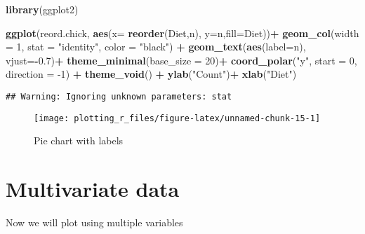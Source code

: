 \documentclass[
]{book}
\newenvironment{Shaded}{\begin{snugshade}}{\end{snugshade}}
\newcommand{\DataTypeTok}[1]{\textcolor[rgb]{0.13,0.29,0.53}{#1}}
\newcommand{\DecValTok}[1]{\textcolor[rgb]{0.00,0.00,0.81}{#1}}
\newcommand{\FloatTok}[1]{\textcolor[rgb]{0.00,0.00,0.81}{#1}}
\newcommand{\KeywordTok}[1]{\textcolor[rgb]{0.13,0.29,0.53}{\textbf{#1}}}
\newcommand{\NormalTok}[1]{#1}
\newcommand{\OperatorTok}[1]{\textcolor[rgb]{0.81,0.36,0.00}{\textbf{#1}}}
\newcommand{\StringTok}[1]{\textcolor[rgb]{0.31,0.60,0.02}{#1}}
\begin{document}
\begin{Shaded}
\begin{Highlighting}[]
\KeywordTok{library}\NormalTok{(ggplot2)}

\KeywordTok{ggplot}\NormalTok{(reord.chick, }\KeywordTok{aes}\NormalTok{(}\DataTypeTok{x=} \KeywordTok{reorder}\NormalTok{(Diet,n), }\DataTypeTok{y=}\NormalTok{n,}\DataTypeTok{fill=}\NormalTok{Diet))}\OperatorTok{+}
\StringTok{  }\KeywordTok{geom_col}\NormalTok{(}\DataTypeTok{width =} \DecValTok{1}\NormalTok{, }
           \DataTypeTok{stat =} \StringTok{"identity"}\NormalTok{, }
           \DataTypeTok{color =} \StringTok{"black"}\NormalTok{) }\OperatorTok{+}
\StringTok{  }\KeywordTok{geom_text}\NormalTok{(}\KeywordTok{aes}\NormalTok{(}\DataTypeTok{label=}\NormalTok{n), }\DataTypeTok{vjust=}\OperatorTok{-}\FloatTok{0.7}\NormalTok{)}\OperatorTok{+}
\StringTok{  }\KeywordTok{theme_minimal}\NormalTok{(}\DataTypeTok{base_size =} \DecValTok{20}\NormalTok{)}\OperatorTok{+}
\StringTok{  }\KeywordTok{coord_polar}\NormalTok{(}\StringTok{"y"}\NormalTok{, }
              \DataTypeTok{start =} \DecValTok{0}\NormalTok{, }
              \DataTypeTok{direction =} \DecValTok{-1}\NormalTok{) }\OperatorTok{+}
\StringTok{  }\KeywordTok{theme_void}\NormalTok{() }\OperatorTok{+}
\StringTok{  }\KeywordTok{ylab}\NormalTok{(}\StringTok{"Count"}\NormalTok{)}\OperatorTok{+}\StringTok{ }\KeywordTok{xlab}\NormalTok{(}\StringTok{"Diet"}\NormalTok{)}
\end{Highlighting}
\end{Shaded}

\begin{verbatim}
## Warning: Ignoring unknown parameters: stat
\end{verbatim}

\begin{figure}

{\centering \texttt{[image: plotting\_r\_files/figure-latex/unnamed-chunk-15-1]} 

}

\caption{Pie chart with labels }\label{fig:unnamed-chunk-15}
\end{figure}

\hypertarget{multivariate-data}{%
\chapter{Multivariate data}\label{multivariate-data}}

Now we will plot using multiple variables
\end{document}
